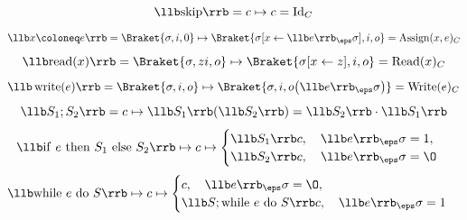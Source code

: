 $$ \llb \mathrm{skip} \rrb = c \mapsto c = \operatorname{Id}_C $$
$$ \llb x \coloneq e \rrb = \Braket{\sigma, i, 0} \mapsto
\Braket{\sigma[x \leftarrow \llb e \rrb_\eps \sigma], i, o} = \operatorname{Assign}(x, e)_C $$
$$ \llb \mathrm{read}(x) \rrb = \Braket{\sigma, zi, o} \mapsto
\Braket{\sigma[x \leftarrow z], i, o} = \operatorname{Read}(x)_C $$
$$ \llb \operatorname{write}(e) \rrb = \Braket{\sigma, i, o} \mapsto
\Braket{\sigma, i, o \bigl( \llb e \rrb_\eps \sigma \bigr)} = \operatorname{Write}(e)_C $$
$$ \llb S_1; S_2 \rrb = c \mapsto \llb S_1 \rrb (\llb S_2 \rrb) =
\llb S_2 \rrb \cdot \llb S_1 \rrb $$
$$ \llb \mathrm{if}~e~\mathrm{then}~S_1~\mathrm{else}~S_2 \rrb \mapsto c \mapsto
\begin{cases}
	\llb S_1 \rrb c, \quad \llb e \rrb_\eps \sigma = 1, \\
	\llb S_2 \rrb c, \quad \llb e \rrb_\eps \sigma = \O
\end{cases} $$
$$ \llb \mathrm{while}~e~\mathrm{do}~S \rrb \mapsto c \mapsto
\begin{cases}
	c, \quad \llb e \rrb_\eps \sigma = \O, \\
	\llb S; \mathrm{while}~e~\mathrm{do}~S \rrb c, \quad \llb e \rrb_\eps \sigma = 1
\end{cases} $$
